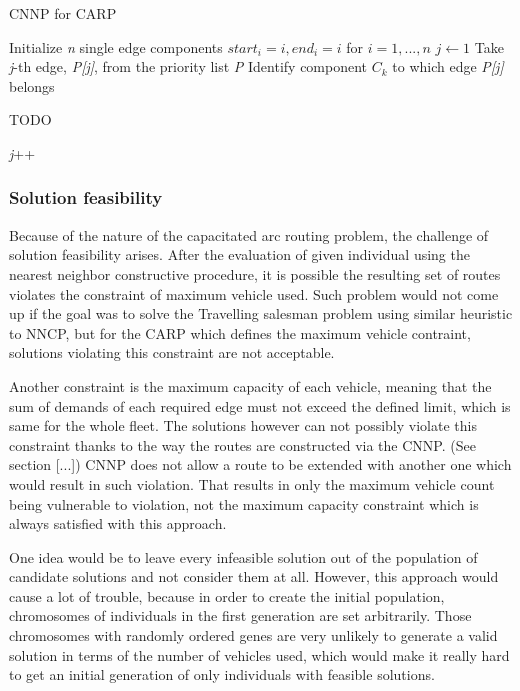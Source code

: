 \documentclass[oneside]{ctuthesis}
\theoremstyle{plain}
\theoremstyle{definition}
\theoremstyle{note}
\begin{document}
\begin{algorithm}
\caption{CNNP for CARP}\label{alg:cap}
\begin{algorithmic}[1]
	\State Initialize \emph{n} single edge components \emph{$ start_i = i, end_i = i $} for \emph{$ i = 1, ..., n $}
	\State $j \gets 1$
	\State Take \emph{j}-th edge, \emph{P[j]}, from the priority list \emph{P}
	\State Identify component \emph{$ C_k $} to which edge \emph{P[j]} belongs
	
	TODO
	
	\State \emph{j}++
	\EndWhile
	
	
\end{algorithmic}
\end{algorithm}


 

\subsubsection{Solution feasibility}
Because of the nature of the capacitated arc routing problem, the challenge of solution feasibility arises. After the evaluation of given individual using the nearest neighbor constructive procedure, it is possible the resulting set of routes violates the constraint of maximum vehicle used. Such problem would not come up if the goal was to solve the Travelling salesman problem using similar heuristic to NNCP, but for the CARP which defines the maximum vehicle contraint, solutions violating this constraint are not acceptable. 

Another constraint is the maximum capacity of each vehicle, meaning that the sum of demands of each required edge must not exceed the defined limit, which is same for the whole fleet. The solutions however can not possibly violate this constraint thanks to the way the routes are constructed via the CNNP. (See section [...]) CNNP does not allow a route to be extended with another one which would result in such violation. That results in only the maximum vehicle count being vulnerable to violation, not the maximum capacity constraint which is always satisfied with this approach.

One idea would be to leave every infeasible solution out of the population of candidate solutions and not consider them at all. However, this approach would cause a lot of trouble, because in order to create the initial population, chromosomes of individuals in the first generation are set arbitrarily. Those chromosomes with randomly ordered genes are very unlikely to generate a valid solution in terms of the number of vehicles used, which would make it really hard to get an initial generation of only individuals with feasible solutions.
\end{document}
